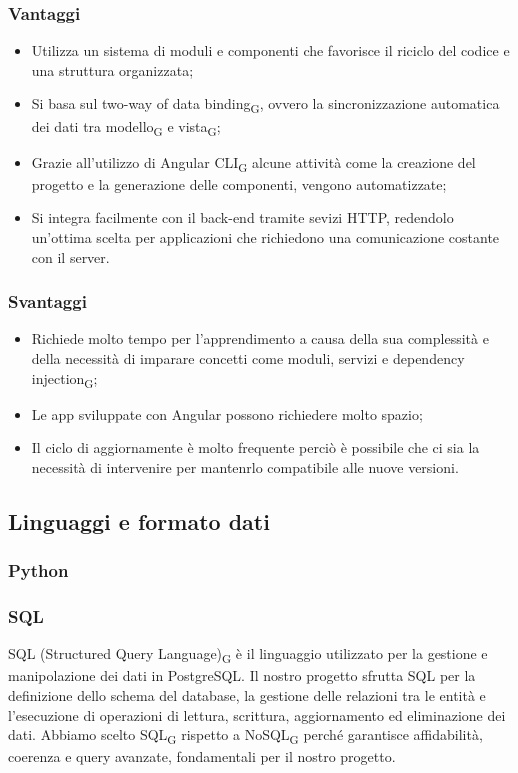 \subsubsection{Vantaggi}
\begin{itemize}
    \item Utilizza un sistema di moduli e componenti che favorisce il riciclo del codice e una struttura organizzata;
    \item Si basa sul two-way of data binding\textsubscript{G}, ovvero la sincronizzazione automatica dei dati tra modello\textsubscript{G} e vista\textsubscript{G};
    \item Grazie all'utilizzo di Angular CLI\textsubscript{G} alcune attività come la creazione del progetto e la generazione delle componenti, vengono automatizzate;
    \item Si integra facilmente con il back-end tramite sevizi HTTP, redendolo un'ottima scelta per applicazioni che richiedono una comunicazione costante con il server.
\end{itemize}
\subsubsection{Svantaggi}
\begin{itemize}
    \item Richiede molto tempo per l'apprendimento a causa della sua complessità e della necessità di imparare concetti come moduli, servizi e dependency injection\textsubscript{G};
    \item Le app sviluppate con Angular possono richiedere molto spazio;
    \item Il ciclo di aggiornamente è molto frequente perciò è possibile che ci sia la necessità di intervenire per mantenrlo compatibile alle nuove versioni.
\end{itemize}

\subsection{Linguaggi e formato dati}
\subsubsection{Python}

\subsubsection{SQL}
SQL (Structured Query Language)\textsubscript{G} è il linguaggio utilizzato per la gestione e manipolazione dei dati in PostgreSQL. Il nostro progetto sfrutta SQL per la definizione dello schema del database, la gestione delle relazioni tra le entità e l’esecuzione di operazioni di lettura, scrittura, aggiornamento ed eliminazione dei dati. Abbiamo scelto SQL\textsubscript{G} rispetto a NoSQL\textsubscript{G} perché garantisce affidabilità, coerenza e query avanzate, fondamentali per il nostro progetto.
